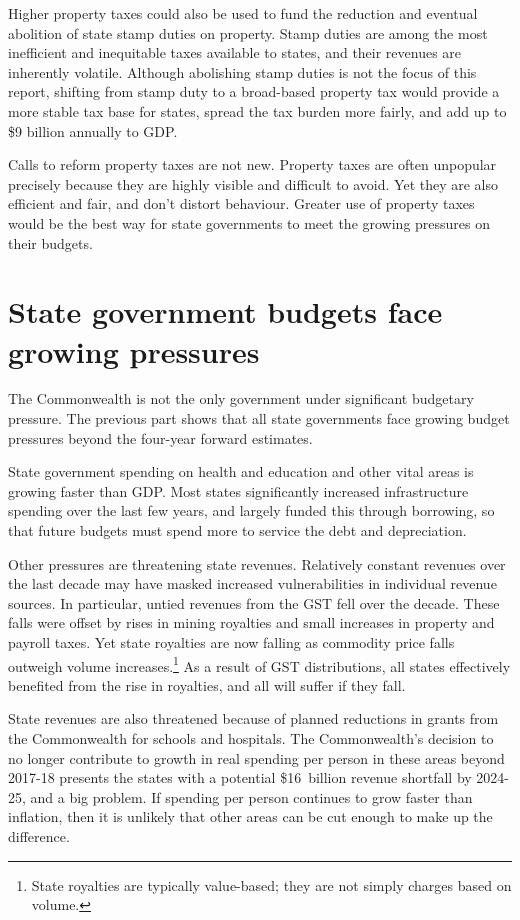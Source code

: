 \documentclass[twoside,english]{Dianab5ona4portrait}
\begin{document}
\begin{overview}[-25pt]
Higher property taxes could also be used to fund the reduction and eventual abolition of state stamp duties on property. Stamp duties are among the most inefficient and inequitable taxes available to states, and their revenues are inherently volatile. Although abolishing stamp duties is not the focus of this report, shifting from stamp duty to a broad-based property tax would provide a more stable tax base for states, spread the tax burden more fairly, and add up to \$9 billion annually to GDP. 

Calls to reform property taxes are not new. Property taxes are often unpopular precisely because they are highly visible and difficult to avoid. Yet they are also efficient and fair, and don’t distort behaviour. Greater use of property taxes would be the best way for state governments to meet the growing pressures on their budgets.
\end{overview}
\chapter{State government budgets face growing pressures}\label{chapter:PROP-1}
The Commonwealth is not the only government under significant budgetary pressure. The previous part shows that all state governments face growing budget pressures beyond the four-year forward estimates. 

State government spending on health and education and other vital areas is growing faster than GDP\@. Most states significantly increased infrastructure spending over the last few years, and largely funded this through borrowing, so that future budgets must spend more to service the debt and depreciation. 

Other pressures are threatening state revenues. Relatively constant revenues over the last decade may have masked increased vulnerabilities in individual revenue sources. In particular, untied revenues from the GST fell over the decade.  These falls were offset by rises in mining royalties and small increases in property and payroll taxes. Yet state royalties are now falling as commodity price falls outweigh volume increases.\footnote{State royalties are typically value-based; they are not simply charges based on volume.}  As a result of GST distributions, all states effectively benefited from the rise in royalties, and all will suffer if they fall. 

State revenues are also threatened because of planned reductions in grants from the Commonwealth for schools and hospitals.  The Commonwealth’s decision to no longer contribute to growth in real spending per person in these areas beyond 2017-18 presents the states with a potential \$16~billion revenue shortfall by 2024-25, and a big problem.  If spending per person continues to grow faster than inflation, then it is unlikely that other areas can be cut enough to make up the difference. 
\end{document}
